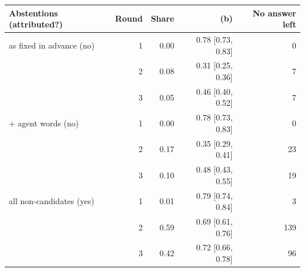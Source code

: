 \begin{tabular}{lrrrr}
\toprule
Abstentions (attributed?) & Round & Share & (b) & No answer left \\
\midrule
as fixed in advance (no) & 1 & 0.00 & 0.78 [0.73, 0.83] & 0 \\
 & 2 & 0.08 & 0.31 [0.25, 0.36] & 7 \\
 & 3 & 0.05 & 0.46 [0.40, 0.52] & 7 \\
+ agent words (no) & 1 & 0.00 & 0.78 [0.73, 0.83] & 0 \\
 & 2 & 0.17 & 0.35 [0.29, 0.41] & 23 \\
 & 3 & 0.10 & 0.48 [0.43, 0.55] & 19 \\
all non-candidates (yes) & 1 & 0.01 & 0.79 [0.74, 0.84] & 3 \\
 & 2 & 0.59 & 0.69 [0.61, 0.76] & 139 \\
 & 3 & 0.42 & 0.72 [0.66, 0.78] & 96 \\
\bottomrule
\end{tabular}
